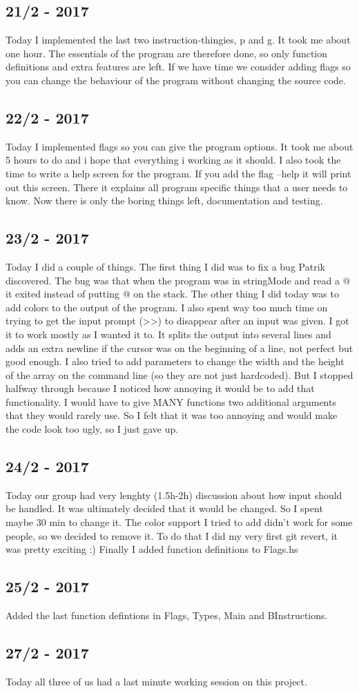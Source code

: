 \documentclass[12pt, a4paper]{article}
\begin{document}
\subsection*{21/2 - 2017}
Today I implemented the last two instruction-thingies, p and g. It took me about
one hour. The essentials of the program are therefore done, so only function definitions
and extra features are left. If we have time we consider adding flags so you
can change the behaviour of the program without changing the source code.

\subsection*{22/2 - 2017}
Today I implemented flags so you can give the program options. It took me about
5 hours to do and i hope that everything i working as it should. I also took
the time to write a help screen for the program. If you add the flag --help
it will print out this screen. There it explains all program specific things
that a user needs to know.
Now there is only the boring things left, documentation and testing.

\subsection*{23/2 - 2017}
Today I did a couple of things. The first thing I did was to fix a bug Patrik
discovered. The bug was that when the program was in stringMode and read a @
it exited instead of putting @ on the stack.
The other thing I did today was to add colors to the output of the program. I also
spent way too much time on trying to get the input prompt (>>) to disappear after
an input was given. I got it to work mostly as I wanted it to. It splits the output
into several lines and adds an extra newline if the cursor was on the beginning
of a line, not perfect but good enough.
I also tried to add parameters to change the width and the height of the array
on the command line (so they are not just hardcoded). But I stopped halfway
through because I noticed how annoying it would be to add that functionality.
I would have to give MANY functions two additional arguments that they would
rarely use. So I felt that it was too annoying and would make the code look too
ugly, so I just gave up.

\subsection*{24/2 - 2017}
Today our group had very lenghty (1.5h-2h) discussion about how input should be handled.
It was ultimately decided that it would be changed. So I spent maybe 30 min to
change it.
The color support I tried to add didn't work for some people, so we decided to
remove it. To do that I did my very first git revert, it was pretty exciting :)
Finally I added function definitions to Flags.hs

\subsection*{25/2 - 2017}
Added the last function defintions in Flags, Types, Main and BInstructions.

\subsection*{27/2 - 2017}
Today all three of us had a last minute working session on this project.
\end{document}
